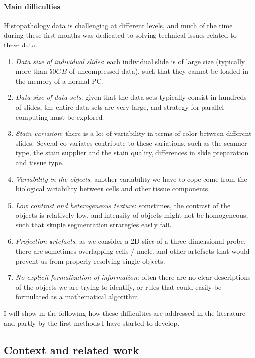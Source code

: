 \documentclass[a4paper,10pt]{article}
\begin{document}
\paragraph{Main difficulties}

Histopathology data is challenging at different levels, and much of
the time during these first months was dedicated to solving technical
issues related to these data: 
\begin{enumerate}
\item {\em Data size of individual slides}: each individual slide is
  of large size (typically more than $50 GB$ of uncompressed data),
  such that they cannot be loaded in the memory of a normal PC. 
\item {\em Data size of data sets}: given that the data sets typically
  consist in hundreds of slides, the entire data sets are very large,
  and strategy for parallel computing must be explored. 
\item {\em Stain variation}: there is a lot of variability in terms of
  color between different slides. Several co-variates contribute to
  these variations, such as the scanner type, the stain supplier and
  the stain quality, differences in slide preparation and tissue
  type. 
\item {\em Variability in the objects}: another variability we have to
  cope come from the biological variability between cells and other
  tissue components. 
\item {\em Low contrast and heterogeneous texture}: sometimes, the contrast of the objects is
  relatively low, and intensity of objects might not be homogeneous,
  such that simple segmentation strategies easily fail. 
\item {\em Projection artefacts}: as we consider a 2D slice of a three
  dimensional probe, there are sometimes overlapping cells / nuclei
  and other artefacts that would prevent us from properly resolving
  single objects.  
\item {\em No explicit formalization of information}: often there are
  no clear descriptions of the objects we are trying to identify, or
  rules that could easily be formulated as a mathematical algorithm.  
\end{enumerate}

I will show in the following how these difficulties are addressed in
the literature and partly by the first methods I have started to
develop. 

\subsection*{Context and related work}
\end{document}
